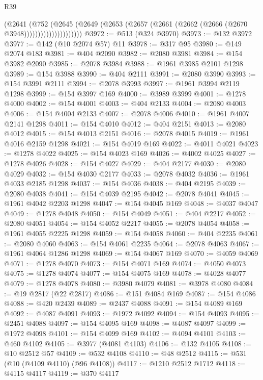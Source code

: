 \begin{lexlean}{R39}
\begin{coremodule}
                          (@2641
                            (@752
                              (@2645
                                (@2649
                                  (@2653
                                    (@2657 (@2661 (@2662 (@2666 (@2670 @3948)))))))))))))))))))))
@3972 := @513 (@324 @3970)
@3973 := @132 @3972
@3977 := @142 (@10 @2074 @57) @11
@3978 := @317 @95
@3980 := @149 @2074 @183
@3981 := @404 @2090
@3982 := @2080 @3981
@3984 := @154 @3982 @2090
@3985 := @2078 @3984
@3988 := @1961 @3985 @2101 @1298
@3989 := @154 @3988
@3990 := @404 @2111
@3991 := @2080 @3990
@3993 := @154 @3991 @2111
@3994 := @2078 @3993
@3997 := @1961 @3994 @2119 @1298
@3999 := @154 @3997 @169
@4000 := @3989 @3999
@4001 := @1278 @4000
@4002 := @154 @4001
@4003 := @404 @2133
@4004 := @2080 @4003
@4006 := @154 @4004 @2133
@4007 := @2078 @4006
@4010 := @1961 @4007 @2141 @1298
@4011 := @154 @4010
@4012 := @404 @2151
@4013 := @2080 @4012
@4015 := @154 @4013 @2151
@4016 := @2078 @4015
@4019 := @1961 @4016 @2159 @1298
@4021 := @154 @4019 @169
@4022 := @4011 @4021
@4023 := @1278 @4022
@4025 := @154 @4023 @169
@4026 := @4002 @4025
@4027 := @1278 @4026
@4028 := @154 @4027
@4029 := @404 @2177
@4030 := @2080 @4029
@4032 := @154 @4030 @2177
@4033 := @2078 @4032
@4036 := @1961 @4033 @2185 @1298
@4037 := @154 @4036
@4038 := @404 @2195
@4039 := @2080 @4038
@4041 := @154 @4039 @2195
@4042 := @2078 @4041
@4045 := @1961 @4042 @2203 @1298
@4047 := @154 @4045 @169
@4048 := @4037 @4047
@4049 := @1278 @4048
@4050 := @154 @4049
@4051 := @404 @2217
@4052 := @2080 @4051
@4054 := @154 @4052 @2217
@4055 := @2078 @4054
@4058 := @1961 @4055 @2225 @1298
@4059 := @154 @4058
@4060 := @404 @2235
@4061 := @2080 @4060
@4063 := @154 @4061 @2235
@4064 := @2078 @4063
@4067 := @1961 @4064 @1286 @1298
@4069 := @154 @4067 @169
@4070 := @4059 @4069
@4071 := @1278 @4070
@4073 := @154 @4071 @169
@4074 := @4050 @4073
@4075 := @1278 @4074
@4077 := @154 @4075 @169
@4078 := @4028 @4077
@4079 := @1278 @4078
@4080 := @3980 @4079
@4081 := @3978 @4080
@4084 := @19 @2817 (@22 @2817)
@4086 := @151 @4084 @169
@4087 := @154 @4086
@4088 := @420 @2439
@4089 := @2437 @4088
@4091 := @154 @4089 @169
@4092 := @4087 @4091
@4093 := @1972 @4092
@4094 := @154 @4093
@4095 := @2451 @4088
@4097 := @154 @4095 @169
@4098 := @4087 @4097
@4099 := @1972 @4098
@4101 := @154 @4099 @169
@4102 := @4094 @4101
@4103 := @460 @4102
@4105 := @3977 (@4081 @4103)
@4106 := @132 @4105
@4108 := @10 @2512 @57
@4109 := @532 @4108
@4110 := @48 @2512
@4115 := @531 (@10 (@4109 @4110) (@96 @4108))
@4117 := @1210 @2512 @1712
@4118 := @4115 @4117
@4119 := @370 @4117

\end{coremodule}
\end{lexlean}
